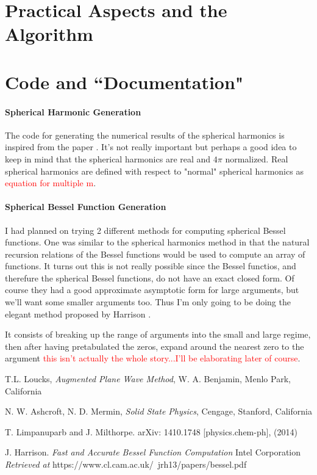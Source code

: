 \documentclass[11pt]{article}
\numberwithin{equation}{section}
\begin{document}
\section{Practical Aspects and the Algorithm}

\section{Code and ``Documentation"}

\paragraph{Spherical Harmonic Generation}
The code for generating the numerical results of the spherical harmonics is inspired from the paper \cite{spherHarm}. It's not really important but perhaps a good idea to keep in mind that the spherical harmonics are real and $4\pi$ normalized. Real spherical harmonics are defined with respect to "normal" spherical harmonics as \textcolor{red}{equation for multiple m}.

\paragraph{Spherical Bessel Function Generation}
I had planned on trying 2 different methods for computing spherical Bessel functions. One was similar to the spherical harmonics method in that the natural recursion relations of the Bessel functions would be used to compute an array of functions. It turns out this is not really possible since the Bessel functios, and therefure the spherical Bessel functions, do not have an exact closed form. Of course they had a good approximate asymptotic form for large arguments, but we'll want some smaller arguments too. Thus I'm only going to be doing the elegant method proposed by Harrison \cite{spherBessel}.

It consists of breaking up the range of arguments into the small and large regime, then after having pretabulated the zeros, expand around the nearest zero to the argument \textcolor{red}{this isn't actually the whole story...I'll be elaborating later of course}.



\begin{thebibliography}{99}

  T.L. Loucks, \textit{Augmented Plane Wave Method}, W. A. Benjamin, Menlo Park, California
  
  N. W. Ashcroft, N. D. Mermin, \textit{Solid State Physics}, Cengage, Stanford, California
  
  T. Limpanuparb and J. Milthorpe. arXiv: 1410.1748 [physics.chem-ph], (2014)
  
  J. Harrison. \textit{Fast and Accurate Bessel Function Computation} Intel Corporation \\
  \textit{Retrieved at } https://www.cl.cam.ac.uk/~jrh13/papers/bessel.pdf
  

\end{thebibliography}
\end{document}
